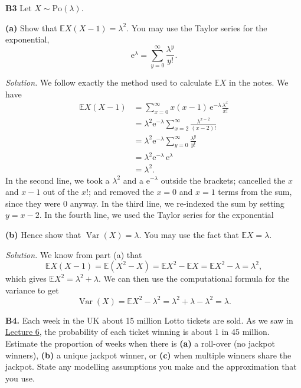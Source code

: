 \documentclass[
  a4paper,
]{book}
\theoremstyle{definition}
\theoremstyle{definition}
\theoremstyle{definition}
\theoremstyle{definition}
\theoremstyle{remark}
\begin{document}
\textbf{B3} Let \(X \sim \text{Po}(\lambda)\).

\textbf{(a)} Show that \(\mathbb EX(X-1) = \lambda^2\). You may use the Taylor series for the exponential,
\[ \mathrm{e}^\lambda = \sum_{y=0}^\infty \frac{\lambda^y}{y!} . \]

\begin{myanswers}
\emph{Solution.}
We follow exactly the method used to calculate \(\mathbb EX\) in the notes. We have
\begin{align*}
\mathbb EX(X-1) &= \sum_{x=0}^\infty x(x-1)\, \mathrm e^{-\lambda} \frac{\lambda^x}{x!} \\
  &= \lambda^2 \mathrm e^{-\lambda} \sum_{x=2}^\infty \frac{\lambda^{x-2}}{(x - 2)!} \\
  &= \lambda^2 \mathrm e^{-\lambda}\sum_{y=0}^\infty  \frac{\lambda^y}{y!} \\
  &= \lambda^2 \mathrm e^{-\lambda} \, \mathrm e^{\lambda} \\
  &= \lambda^2  .
\end{align*}
In the second line, we took a \(\lambda^2\) and a \(\mathrm e^{-\lambda}\) outside the brackets; cancelled the \(x\) and \(x-1\) out of the \(x!\); and removed the \(x = 0\) and \(x = 1\) terms from the sum, since they were 0 anyway. In the third line, we re-indexed the sum by setting \(y = x - 2\). In the fourth line, we used the Taylor series for the exponential

\end{myanswers}

\textbf{(b)} Hence show that \(\operatorname{Var}(X) = \lambda\). You may use the fact that \(\mathbb EX = \lambda\).

\begin{myanswers}
\emph{Solution.}
We know from part (a) that
\[ \mathbb EX(X-1) = \mathbb E(X^2 - X) = \mathbb EX^2 - \mathbb EX = \mathbb EX^2 - \lambda = \lambda^2 ,\]
which gives \(\mathbb EX^2 = \lambda^2 + \lambda\). We can then use the computational formula for the variance to get
\[ \operatorname{Var}(X) = \mathbb EX^2 - \lambda^2 = \lambda^2 + \lambda - \lambda^2 = \lambda .\]

\end{myanswers}

\textbf{B4.} Each week in the UK about 15 million Lotto tickets are sold. As we saw in \protect\hyperlink{combinations}{Lecture 6}, the probability of each ticket winning is about 1 in 45 million. Estimate the proportion of weeks when there is \textbf{(a)} a roll-over (no jackpot winners), \textbf{(b)} a unique jackpot winner, or \textbf{(c)} when multiple winners share the jackpot. State any modelling assumptions you make and the approximation that you use.
\end{document}
